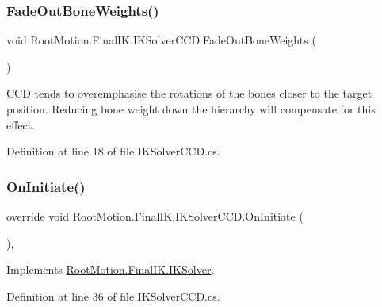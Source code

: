\subsubsection{\texorpdfstring{Fade\+Out\+Bone\+Weights()}{FadeOutBoneWeights()}}
{\footnotesize\ttfamily void Root\+Motion.\+Final\+I\+K.\+I\+K\+Solver\+C\+C\+D.\+Fade\+Out\+Bone\+Weights (\begin{DoxyParamCaption}{ }\end{DoxyParamCaption})}



C\+CD tends to overemphasise the rotations of the bones closer to the target position. Reducing bone weight down the hierarchy will compensate for this effect. 



Definition at line 18 of file I\+K\+Solver\+C\+C\+D.\+cs.

\mbox{\label{class_root_motion_1_1_final_i_k_1_1_i_k_solver_c_c_d_ac5297e593852814356258fe9f51a2774}} 
\subsubsection{\texorpdfstring{On\+Initiate()}{OnInitiate()}}
{\footnotesize\ttfamily override void Root\+Motion.\+Final\+I\+K.\+I\+K\+Solver\+C\+C\+D.\+On\+Initiate (\begin{DoxyParamCaption}{ }\end{DoxyParamCaption})\hspace{0.3cm}{\ttfamily [protected]}, {\ttfamily [virtual]}}



Implements \mbox{\hyperlink{class_root_motion_1_1_final_i_k_1_1_i_k_solver_a2a8cbf1dfed274fdbc79ff011c468cc6}{Root\+Motion.\+Final\+I\+K.\+I\+K\+Solver}}.



Definition at line 36 of file I\+K\+Solver\+C\+C\+D.\+cs.

\mbox{\label{class_root_motion_1_1_final_i_k_1_1_i_k_solver_c_c_d_a1f3584003199b9f26fdbe7f6ac912c11}} 
